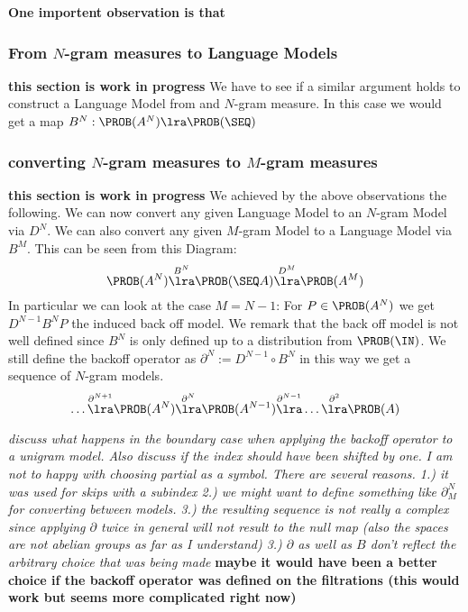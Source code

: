 \documentclass[11pt]{article}
\begin{document}
\textbf{One importent observation is that }

\subsubsection{From $N$-gram measures to Language Models}
\textbf{this section is work in progress}
We have to see if a similar argument holds to construct a Language Model from and $N$-gram measure. 
In this case we would get a map $B^N : \PROB(A^N) \lra \PROB(\SEQ)$

\newcommand{\BACK}[1]{{\partial^{#1}}}

\subsubsection{converting $N$-gram measures to $M$-gram measures}
\textbf{this section is work in progress}
We achieved by the above observations the following. 
We can now convert any given Language Model to an $N$-gram Model via $D^N$. We can also convert any given $M$-gram Model to a Language Model via $B^M$.
This can be seen from this Diagram:
\[ \PROB(A^N) \overset{B^N}{\lra} \PROB(\SEQ A) \overset{D^M}{\lra} \PROB(A^M) \]
In particular we can look at the case $M=N-1$:
For $P \in \PROB(A^N)$ we get $D^{N-1}B^NP$ the induced back off model.
We remark that the back off model is not well defined since $B^N$ is only defined up to a distribution from $\PROB(\IN)$.
We still define the backoff operator as $\BACK{N}:=D^{N-1} \circ B^{N}$ in this way we get a sequence of $N$-gram models.
\[ \dots \overset{\BACK{N+1}}{\lra} \PROB(A^{N}) \overset{\BACK{N}}{\lra} \PROB(A^{N-1}) \overset{\BACK{N-1}}{\lra} \dots \overset{\BACK{2}}{\lra} \PROB(A)  \]

\textit{discuss what happens in the boundary case when applying the backoff operator to a unigram model. Also discuss if the index should have been shifted by one.}
\textit{I am not to happy with choosing partial as a symbol. There are several reasons. 1.) it was used for skips with a subindex 2.) we might want to define something like $\partial_M^N$ for converting between models. 3.) the resulting sequence is not really a complex since applying $\partial$ twice in general will not result to the null map (also the spaces are not abelian groups as far as I understand) 3.) $\partial$ as well as $B$ don't reflect the arbitrary choice that was being made}
\textbf{maybe it would have been a better choice if the backoff operator was defined on the filtrations (this would work but seems more complicated right now)}
\end{document}
